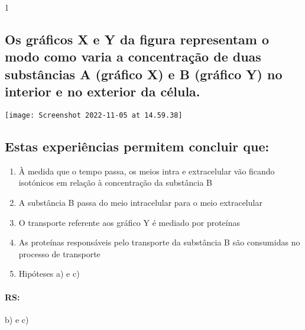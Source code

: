 \documentclass[\mainfilename]{subfiles}
\begin{document}
\begin{questionBox}1{} %

    \subsection*{
        Os gráficos X e Y da figura representam o modo como varia a concentração de duas substâncias A (gráfico X) e B (gráfico Y) no interior e no exterior da célula.
    }

    \begin{center}
        \texttt{[image: Screenshot 2022-11-05 at 14.59.38]}
    \end{center}

    \subsection*{Estas experiências permitem concluir que:}
    \begin{enumerate}[label=\alph{enumi})]
        \item À medida que o tempo passa, os meios intra e extracelular vão ficando isotónicos em relação à concentração da substância B
        \item A substância B passa do meio intracelular para o meio extracelular 
        \item O transporte referente aos gráfico Y é mediado por proteínas
        \item As proteínas responsáveis pelo transporte da substância B são consumidas no processo de transporte
        \item Hipóteses a) e c)
    \end{enumerate}
    
    \paragraph*{RS:} b) e c)
    
\end{questionBox}
\end{document}
